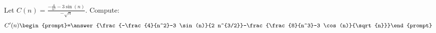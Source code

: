 \documentclass{ximera}
\author{Bart Snapp}
\begin{document}
\begin{exercise}
Let $C(n) = \frac{ -\frac{4}{n^2}-3 \sin (n)}{-\sqrt{n}}$. Compute:
\[
C'(n)
\begin{prompt}=\answer{\frac{-\frac{4}{n^2}-3 \sin (n)}{2 n^{3/2}}-\frac{\frac{8}{n^3}-3 \cos (n)}{\sqrt{n}}}\end{prompt}
\]
\end{exercise}
\end{document}
